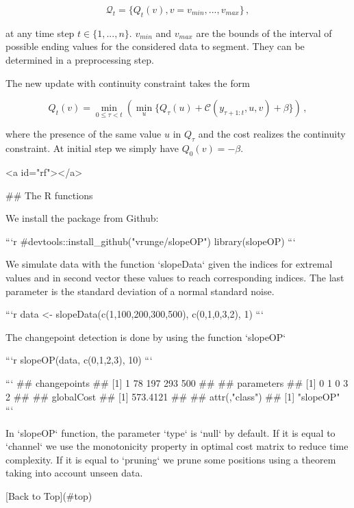 $$
\mathcal{Q}_t = \{Q_t(v), v= v_{min},...,v_{max}\}\,,
$$

at any time step $t \in \{1,...,n\}$. $v_{min}$ and $v_{max}$ are the bounds of the interval of possible ending values for the considered data to segment. They can be determined in a preprocessing step.

The new update with continuity constraint takes the form

$$
Q_t(v) = \min_{0 \le \tau < t}\left( \min_{u}\{Q_{\tau}(u) + \mathcal{C}(y_{\tau+1:t},u,v) + \beta\}\right)\,,
$$

where the presence of the same value $u$ in $Q_{\tau}$ and the cost realizes the continuity constraint. At initial step we simply have $Q_0(v) = -\beta$.


<a id="rf"></a>

## The R functions

We install the package from Github:


```r
#devtools::install_github("vrunge/slopeOP")
library(slopeOP)
```

We simulate data with the function `slopeData` given the indices for extremal values and in second vector these values to reach corresponding indices. The last parameter is the standard deviation of a normal standard noise.


```r
data <- slopeData(c(1,100,200,300,500), c(0,1,0,3,2), 1)
```

The changepoint detection is done by using the function `slopeOP`


```r
slopeOP(data, c(0,1,2,3), 10)
```

```
## changepoints
## [1]   1  78 197 293 500
##
## parameters
## [1] 0 1 0 3 2
##
## globalCost
## [1] 573.4121
##
## attr(,"class")
## [1] "slopeOP"
```

In `slopeOP` function, the parameter `type` is `null` by default. If it is equal to `channel` we use the monotonicity property in optimal cost matrix to reduce time complexity. If it is equal to `pruning` we prune some positions using a theorem taking into account unseen data.


[Back to Top](#top)
